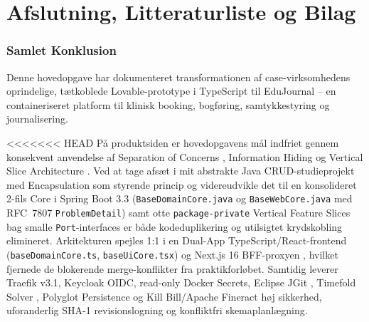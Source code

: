 \documentclass[11pt,a4paper]{article}
\begin{document}
\begin{table}[htbp]
\begin{table}[htbp]
\newpage
\part*{Afslutning, Litteraturliste og Bilag}

\section{Samlet Konklusion}

Denne hovedopgave har dokumenteret transformationen af case-virksomhedens oprindelige, tætkoblede Lovable-prototype i TypeScript til EduJournal -- en containeriseret platform til klinisk booking, bogføring, samtykkestyring og journalisering.

<<<<<<< HEAD
På produktsiden er hovedopgavens mål indfriet gennem konsekvent anvendelse af Separation of Concerns \cite{fowler2002}, Information Hiding \cite{parnas1972} og Vertical Slice Architecture \cite{bogard2018}. Ved at tage afsæt i mit abstrakte Java CRUD-studieprojekt med Encapsulation som styrende princip og videreudvikle det til en konsolideret 2-fils Core i Spring Boot 3.3 (\texttt{BaseDomainCore.java} og \texttt{BaseWebCore.java} med RFC~7807 \texttt{ProblemDetail}) samt otte \texttt{package-private} Vertical Feature Slices bag smalle \texttt{Port}-interfaces er både kodeduplikering og utilsigtet krydskobling elimineret. Arkitekturen spejles 1:1 i en Dual-App TypeScript/React-frontend (\texttt{baseDomainCore.ts}, \texttt{baseUiCore.tsx}) og Next.js 16 BFF-proxyen \cite{newman2021}, hvilket fjernede de blokerende merge-konflikter fra praktikforløbet. Samtidig leverer Traefik v3.1, Keycloak OIDC, read-only Docker Secrets, Eclipse JGit \cite{jgit2024}, Timefold Solver \cite{timefold2024}, Polyglot Persistence og Kill Bill/Apache Fineract høj sikkerhed, uforanderlig SHA-1 revisionslogning og konfliktfri skemaplanlægning.


\end{table}
\end{table}
\end{document}
